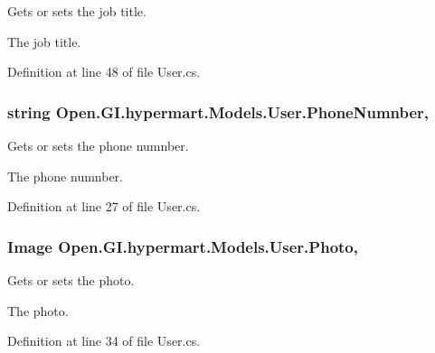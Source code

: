 Gets or sets the job title. 

The job title. 

Definition at line 48 of file User.\+cs.

\hypertarget{class_open_1_1_g_i_1_1hypermart_1_1_models_1_1_user_a70e545515c09bf8fc7a646c8f1a883a2}{}
\subsubsection[{Phone\+Numnber}]{\setlength{\rightskip}{0pt plus 5cm}string Open.\+G\+I.\+hypermart.\+Models.\+User.\+Phone\+Numnber\hspace{0.3cm}{\ttfamily [get]}, {\ttfamily [set]}}\label{class_open_1_1_g_i_1_1hypermart_1_1_models_1_1_user_a70e545515c09bf8fc7a646c8f1a883a2}


Gets or sets the phone numnber. 

The phone numnber. 

Definition at line 27 of file User.\+cs.

\hypertarget{class_open_1_1_g_i_1_1hypermart_1_1_models_1_1_user_ae5b46912f2c2765d720a0a4754cc1921}{}
\subsubsection[{Photo}]{\setlength{\rightskip}{0pt plus 5cm}Image Open.\+G\+I.\+hypermart.\+Models.\+User.\+Photo\hspace{0.3cm}{\ttfamily [get]}, {\ttfamily [set]}}\label{class_open_1_1_g_i_1_1hypermart_1_1_models_1_1_user_ae5b46912f2c2765d720a0a4754cc1921}


Gets or sets the photo. 

The photo. 

Definition at line 34 of file User.\+cs.

\hypertarget{class_open_1_1_g_i_1_1hypermart_1_1_models_1_1_user_a8681bb284b2bce5e87537a5dedc2dc05}{}
